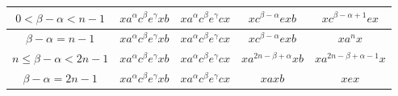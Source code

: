 \documentclass{article}
\theoremstyle{definition}
\begin{document}
\begin{center}
\begin{tabular}{|c|c|c|c|c|}
\hline
$0<\beta-\alpha<n-1$ & $ x a^\alpha c^\beta e^\gamma x b$ & $ x a^\alpha c^\beta e^\gamma c x $ & $ x c^{\beta-\alpha} e x b $ &  $ x  c^{\beta-\alpha+1} e x $\\
\hline
$\beta-\alpha=n-1$ & $ x a^\alpha c^\beta e^\gamma x b$ & $ x a^\alpha c^\beta e^\gamma c x $ & $ x c^{\beta-\alpha} e x b $ &  $ x  a^n x $\\
\hline
$n \le \beta-\alpha < 2n-1$ & $ x a^\alpha c^\beta e^\gamma x b$ & $ x a^\alpha c^\beta e^\gamma c x $ & $ x a^{2n-\beta+\alpha} x b $ &  $ x  a^{2n-\beta+\alpha-1} x $\\
\hline
$\beta - \alpha = 2n-1$ & $ x a^\alpha c^\beta e^\gamma x b$ & $ x a^\alpha c^\beta e^\gamma c x $ & $ x a x b $ &  $ x e x $\\
\hline
\end{tabular}
\end{center}
\end{document}
